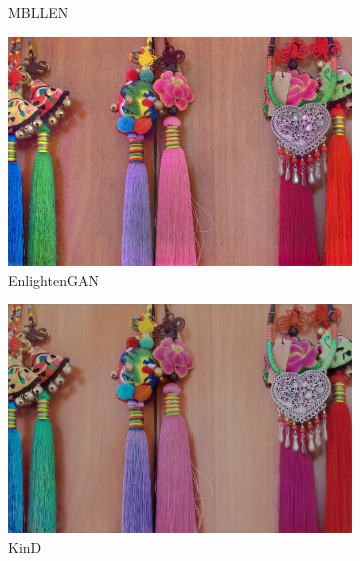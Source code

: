 \documentclass[a4paper, 10pt]{article}
\begin{document}
\begin{figure}[htb]
\begin{subfigure}{0.19\textwidth}
				\captionsetup{font=scriptsize}
				\caption{MBLLEN}
				\label{fig: MBLLEN1}
			\end{subfigure}
			\begin{subfigure}{0.19\textwidth}
				\includegraphics[width=\linewidth]{picture/LLIE/Experiment/EnlightenGAN1}
				\captionsetup{font=scriptsize}
				\caption{EnlightenGAN}
				\label{fig: EnlightenGAN1}
			\end{subfigure}
			\begin{subfigure}{0.19\textwidth}
				\includegraphics[width=\linewidth]{picture/LLIE/Experiment/KinD1}
				\captionsetup{font=scriptsize}
				\caption{KinD}
				\label{fig: KinD1}
			\end{subfigure}\\
			\begin{subfigure}{0.19\textwidth}

\end{subfigure}
\end{figure}
\end{document}
